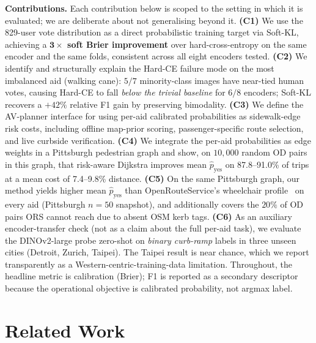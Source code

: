 \documentclass[conference]{IEEEtran}
\begin{document}
\textbf{Contributions.} Each contribution below is scoped to the setting in which it is evaluated; we are deliberate about not generalising beyond it. \textbf{(C1)} We use the 829-user vote distribution as a direct probabilistic training target via Soft-KL, achieving a \textbf{$\boldsymbol{3\times}$ soft Brier improvement} over hard-cross-entropy on the same encoder and the same folds, consistent across all eight encoders tested. \textbf{(C2)} We identify and structurally explain the Hard-CE failure mode on the most imbalanced aid (walking cane): $5/7$ minority-class images have near-tied human votes, causing Hard-CE to fall \emph{below the trivial baseline} for $6/8$ encoders; Soft-KL recovers a $+42\%$ relative F1 gain by preserving bimodality. \textbf{(C3)} We define the AV-planner interface for using per-aid calibrated probabilities as sidewalk-edge risk costs, including offline map-prior scoring, passenger-specific route selection, and live curbside verification. \textbf{(C4)} We integrate the per-aid probabilities as edge weights in a Pittsburgh pedestrian graph and show, on $10{,}000$ random OD pairs in this graph, that risk-aware Dijkstra improves mean $\hat{p}_\mathrm{yes}$ on 87.8--91.0\% of trips at a mean cost of 7.4--9.8\% distance. \textbf{(C5)} On the same Pittsburgh graph, our method yields higher mean $\hat{p}_\mathrm{yes}$ than OpenRouteService's wheelchair profile~\cite{openrouteservice2026wheelchair} on every aid (Pittsburgh $n=50$ snapshot), and additionally covers the $20\%$ of OD pairs ORS cannot reach due to absent OSM kerb tags. \textbf{(C6)} As an auxiliary encoder-transfer check (not as a claim about the full per-aid task), we evaluate the DINOv2-large probe zero-shot on \emph{binary curb-ramp} labels in three unseen cities (Detroit, Zurich, Taipei). The Taipei result is near chance, which we report transparently as a Western-centric-training-data limitation. Throughout, the headline metric is calibration (Brier); F1 is reported as a secondary descriptor because the operational objective is calibrated probability, not argmax label.

\section{Related Work}
\label{sec:related}
\end{document}
